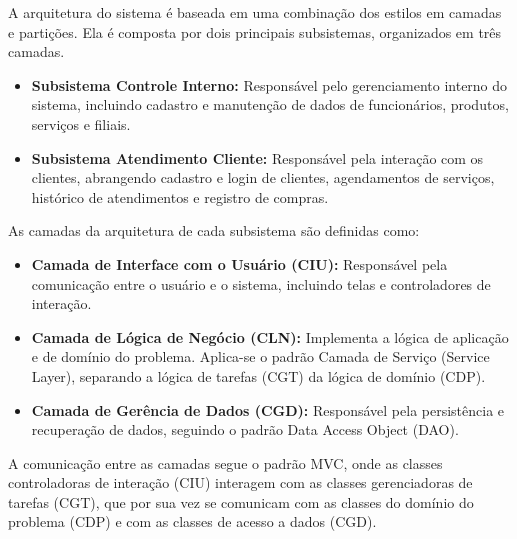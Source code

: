 A arquitetura do sistema \emph{\imprimirtitulo} é baseada em uma combinação dos estilos em camadas e partições. Ela é composta por dois principais subsistemas, organizados em três camadas.
\begin{itemize}
	\item \textbf{Subsistema Controle Interno:} Responsável pelo gerenciamento interno do sistema, incluindo cadastro e manutenção de dados de funcionários, produtos, serviços e filiais.
	\item \textbf{Subsistema Atendimento Cliente:} Responsável pela interação com os clientes, abrangendo cadastro e login de clientes, agendamentos de serviços, histórico de atendimentos e registro de compras.
\end{itemize}
As camadas da arquitetura de cada subsistema são definidas como:
\begin{itemize}
	\item \textbf{Camada de Interface com o Usuário (CIU):} Responsável pela comunicação entre o usuário e o sistema, incluindo telas e controladores de interação.
	\item \textbf{Camada de Lógica de Negócio (CLN):} Implementa a lógica de aplicação e de domínio do problema. Aplica-se o padrão Camada de Serviço (Service Layer), separando a lógica de tarefas (CGT) da lógica de domínio (CDP).
	\item \textbf{Camada de Gerência de Dados (CGD):} Responsável pela persistência e recuperação de dados, seguindo o padrão Data Access Object (DAO).
\end{itemize}
A comunicação entre as camadas segue o padrão MVC, onde as classes controladoras de interação (CIU) interagem com as classes gerenciadoras de tarefas (CGT), que por sua vez se comunicam com as classes do domínio do problema (CDP) e com as classes de acesso a dados (CGD).

\vspace{0.5cm}
